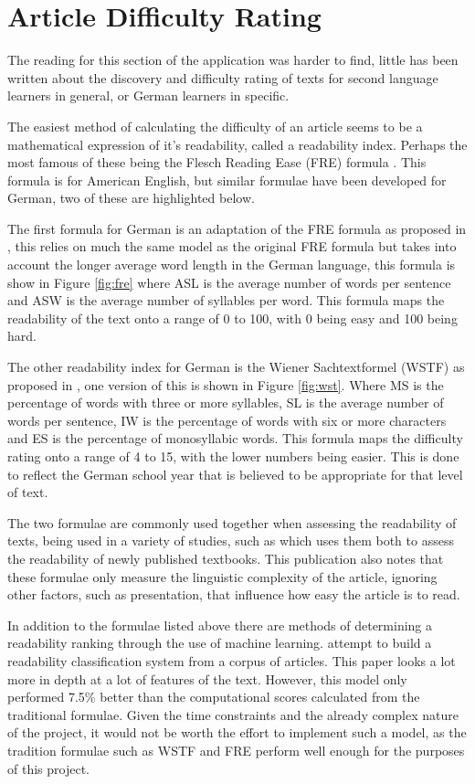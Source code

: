 \section{Article Difficulty Rating}

The reading for this section of the application was harder to find, little has been written about the discovery and difficulty rating of texts for second language learners in general, or German learners in specific. 

The easiest method of calculating the difficulty of an article seems to be a mathematical expression of it's readability, called a readability index. Perhaps the most famous of these being the Flesch Reading Ease (FRE) formula \autocite{flesch1948}. This formula is for American English, but similar formulae have been developed for German, two of these are highlighted below.

The first formula for German is an adaptation of the FRE formula as proposed in \textcite{amstad1978}, this relies on much the same model as the original FRE formula but takes into account the longer average word length in the German language, this formula is show in Figure \ref{fig:fre} where ASL is the average number of words per sentence and ASW is the average number of syllables per word. This formula maps the readability of the text onto a range of 0 to 100, with 0 being easy and 100 being hard. 



The other readability index for German is the  Wiener Sachtextformel (WSTF) as proposed in \textcite{bamberger1984}, one version of this is shown in Figure \ref{fig:wst}. Where MS is the percentage of words with three or more syllables, SL is the average number of words per sentence, IW is the percentage of words with six or more characters and ES is the percentage of monosyllabic words. This formula maps the difficulty rating onto a range of 4 to 15, with the lower numbers being easier. This is done to reflect the German school year that is believed to be appropriate for that level of text.



The two formulae are commonly used together when assessing the readability of texts, being used in a variety of studies, such as \textcite{rottensteiner2010} which uses them both to assess the readability of newly published textbooks. This publication also notes that these formulae only measure the linguistic complexity of the article, ignoring other factors, such as presentation, that influence how easy the article is to read. 

In addition to the formulae listed above there are methods of determining a readability ranking through the use of machine learning. \textcite{hancke2012} attempt to build a readability classification system from a corpus of articles. This paper looks a lot more in depth at a lot of features of the text. However, this model only performed 7.5\% better than the computational scores calculated from the traditional formulae. Given the time constraints and the already complex nature of the project, it would not be worth the effort to implement such a model, as the tradition formulae such as WSTF and FRE perform well enough for the purposes of this project. 